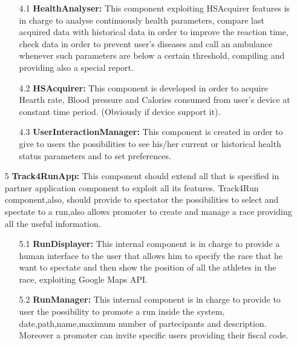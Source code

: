 \begin{enumerate}
	\begin{enumerate}
	\item [4.1]\textbf{HealthAnalyser: }
	This component exploiting HSAcquirer features is in charge to analyse continuously health parameters, compare last acquired data with historical data in order to improve the reaction time, check data in order to prevent user's diseases and call an ambulance whenever such parameters are below a certain threshold, compiling and providing also a special report.
	
	\item [4.2]\textbf{HSAcquirer:}
	This component is developed in order to acquire Hearth rate, Blood pressure and Calories consumed from user's device at constant time period. (Obviously if device support it). 
	
	\item [4.3]\textbf{UserInteractionManager:}
	This component is created in order to give to users the possibilities to see his/her current or historical health status parameters and to set preferences.
	\end{enumerate}
	

\item [5]\textbf{Track4RunApp: }
This component should extend all that is specified in partner application component to exploit all its features. Track4Run component,also, should provide to spectator the possibilities to select and spectate to a run,also allows promoter to create and manage a race providing all the useful information.
	
		\begin{enumerate}
	\item [5.1]\textbf{RunDisplayer: }
	 This internal component is in charge to provide a human interface to the user that allows him to specify the race that he want to spectate and then show the position of all the athletes in the race, exploiting Google Maps API.
	
	\item [5.2]\textbf{RunManager: }
	This internal component is in charge to provide to user the possibility to promote a run inside the system, date,path,name,maximum number of partecipants and description. Moreover a promoter can invite specific users providing their fiscal code. 
	\end{enumerate}
\end{enumerate}
\clearpage

